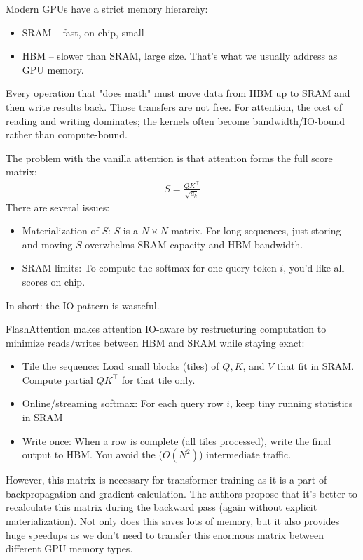 Modern GPUs have a strict memory hierarchy:
\begin{itemize}
	\item SRAM – fast, on-chip, small
	\item HBM – slower than SRAM, large size. That's what we usually address as GPU memory.
\end{itemize}
Every operation that "does math" must move data from HBM up to SRAM and then write results back. Those transfers are not free. For attention, the cost of reading and writing dominates; the kernels often become bandwidth/IO-bound rather than compute-bound.

The problem with the vanilla attention is that attention forms the full score matrix:
\begin{align*}
	S = \frac{QK^\top}{\sqrt{d_k}}
\end{align*}
There are several issues:
\begin{itemize}
	\item Materialization of $S$: $S$ is a $N\times N$ matrix. For long sequences, just storing and moving $S$ overwhelms SRAM capacity and HBM bandwidth.
	\item SRAM limits: To compute the softmax for one query token $i$, you'd like all scores on chip.
\end{itemize}
In short: the IO pattern is wasteful.

FlashAttention makes attention IO-aware by restructuring computation to minimize reads/writes between HBM and SRAM while staying exact:
\begin{itemize}
	\item Tile the sequence: Load small blocks (tiles) of $Q, K$, and $V$ that fit in SRAM. Compute partial $QK^⊤$ for that tile only.
	\item Online/streaming softmax: For each query row $i$, keep tiny running statistics in SRAM
	\item Write once: When a row is complete (all tiles processed), write the final output to HBM. You avoid the ($O(N^2)$) intermediate traffic.
\end{itemize}

However, this matrix is necessary for transformer training as it is a part of backpropagation and gradient calculation. The authors propose that it's better to recalculate this matrix during the backward pass (again without explicit materialization). Not only does this saves lots of memory, but it also provides huge speedups as we don't need to transfer this enormous matrix between different GPU memory types.

